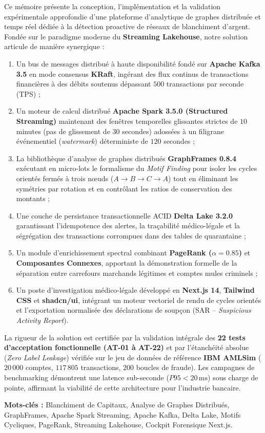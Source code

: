 Ce mémoire présente la conception, l'implémentation et la validation expérimentale approfondie d'une plateforme d'analytique de graphes distribuée et temps réel dédiée à la détection proactive de réseaux de blanchiment d'argent. Fondée sur le paradigme moderne du \textbf{Streaming Lakehouse}, notre solution articule de manière synergique :
\begin{enumerate}
    \item Un bus de messages distribué à haute disponibilité fondé sur \textbf{Apache Kafka 3.5} en mode consensus \textbf{KRaft}, ingérant des flux continus de transactions financières à des débits soutenus dépassant $500$ transactions par seconde (TPS) ;
    \item Un moteur de calcul distribué \textbf{Apache Spark 3.5.0 (Structured Streaming)} maintenant des fenêtres temporelles glissantes strictes de $10$ minutes (pas de glissement de $30$ secondes) adossées à un filigrane événementiel (\textit{watermark}) déterministe de $120$ secondes ;
    \item La bibliothèque d'analyse de graphes distribués \textbf{GraphFrames 0.8.4} exécutant en micro-lots le formalisme du \textit{Motif Finding} pour isoler les cycles orientés fermés à trois nœuds ($A \to B \to C \to A$) tout en éliminant les symétries par rotation et en contrôlant les ratios de conservation des montants ;
    \item Une couche de persistance transactionnelle ACID \textbf{Delta Lake 3.2.0} garantissant l'idempotence des alertes, la traçabilité médico-légale et la ségrégation des transactions corrompues dans des tables de quarantaine ;
    \item Un module d'enrichissement spectral combinant \textbf{PageRank ($\alpha=0.85$)} et \textbf{Composantes Connexes}, apportant la démonstration formelle de la séparation entre carrefours marchands légitimes et comptes mules criminels ;
    \item Un poste d'investigation médico-légale développé en \textbf{Next.js 14}, \textbf{Tailwind CSS} et \textbf{shadcn/ui}, intégrant un moteur vectoriel de rendu de cycles orientés et l'exportation normalisée des déclarations de soupçon (SAR -- \textit{Suspicious Activity Report}).
\end{enumerate}

La rigueur de la solution est certifiée par la validation intégrale des \textbf{22 tests d'acceptation fonctionnelle (AT-01 à AT-22)} et par l'étanchéité absolue (\textit{Zero Label Leakage}) vérifiée sur le jeu de données de référence \textbf{IBM AMLSim} ($20\,000$ comptes, $117\,805$ transactions, $200$ boucles de fraude). Les campagnes de benchmarking démontrent une latence sub-seconde ($P95 < 20\,\text{ms}$) sous charge de pointe, affirmant la viabilité de cette architecture pour l'industrie bancaire.

\vspace{0.8cm}
\noindent\textbf{Mots-clés :} Blanchiment de Capitaux, Analyse de Graphes Distribués, GraphFrames, Apache Spark Streaming, Apache Kafka, Delta Lake, Motifs Cycliques, PageRank, Streaming Lakehouse, Cockpit Forensique Next.js.
